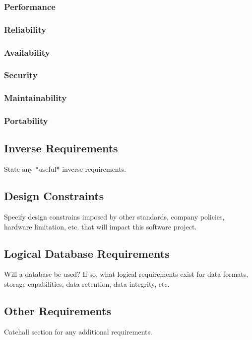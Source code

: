 \documentclass[titlepage]{article}
\begin{document}
\subsubsection{Performance}

\subsubsection{Reliability}

\subsubsection{Availability}

\subsubsection{Security}

\subsubsection{Maintainability}

\subsubsection{Portability}

\subsection{Inverse Requirements}
State any *useful* inverse requirements.

\subsection{Design Constraints}
Specify design constrains imposed by other standards, company policies, hardware limitation, etc. that will impact this software project.

\subsection{Logical Database Requirements}
Will a database be used?  If so, what logical requirements exist for data formats, storage capabilities, data retention, data integrity, etc.

\subsection{Other Requirements}
Catchall section for any additional requirements.
\end{document}
